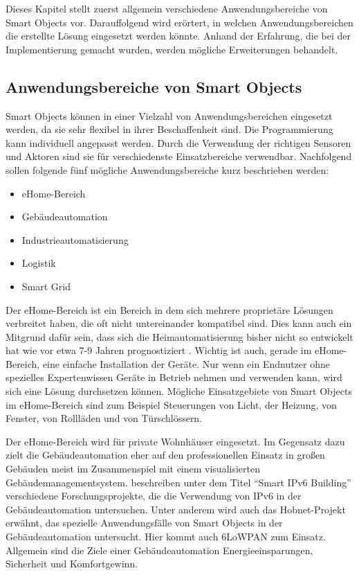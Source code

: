 Dieses Kapitel stellt zuerst allgemein verschiedene Anwendungsbereiche von Smart Objects vor. Darauffolgend wird erörtert, in welchen Anwendungsbereichen die erstellte Lösung eingesetzt werden könnte. Anhand der Erfahrung, die bei der Implementierung gemacht wurden, werden mögliche Erweiterungen behandelt.

\subsection{Anwendungsbereiche von Smart Objects}

Smart Objects können in einer Vielzahl von Anwendungsbereichen eingesetzt werden, da sie sehr flexibel in ihrer Beschaffenheit sind. Die Programmierung kann individuell angepasst werden. Durch die Verwendung der richtigen Sensoren und Aktoren sind sie für verschiedenste Einsatzbereiche verwendbar. Nachfolgend sollen folgende fünf mögliche Anwendungsbereiche kurz beschrieben werden:

\begin{itemize}
	\itemsep 0pt
	\item eHome-Bereich
	\item Gebäudeautomation
	\item Industrieautomatisierung
	\item Logistik
	\item Smart Grid
\end{itemize}

Der eHome-Bereich ist ein Bereich in dem sich mehrere proprietäre Lösungen verbreitet haben, die oft nicht untereinander kompatibel sind. Dies kann auch ein Mitgrund dafür sein, dass sich die Heimautomatisierung bisher nicht so entwickelt hat wie vor etwa 7-9 Jahren prognostiziert \citep[360]{vasseur10interconnecting}. Wichtig ist auch, gerade im eHome-Bereich, eine einfache Installation der Geräte. Nur wenn ein Endnutzer ohne spezielles Expertenwissen Geräte in Betrieb nehmen und verwenden kann, wird sich eine Lösung durchsetzen können. Mögliche Einsatzgebiete von Smart Objects im eHome-Bereich sind zum Beispiel Steuerungen von Licht, der Heizung, von Fenster, von Rollläden und von Türschlössern.

Der eHome-Bereich wird für private Wohnhäuser eingesetzt. Im Gegensatz dazu zielt die Gebäudeautomation eher auf den professionellen Einsatz in großen Gebäuden meist im Zusammenspiel mit einem visualisierten Gebäudemanagementsystem. \textcite[Seite 304ff]{Vermesan:TheInternetOfThings} beschreiben unter dem Titel "`Smart IPv6 Building"' verschiedene Forschungsprojekte, die die Verwendung von IPv6 in der Gebäudeautomation untersuchen. Unter anderem wird auch das Hobnet-Projekt erwähnt, das spezielle Anwendungsfälle von Smart Objects in der Gebäudeautomation untersucht. Hier kommt auch 6LoWPAN zum Einsatz. Allgemein sind die Ziele einer Gebäudeautomation Energieeinsparungen, Sicherheit und Komfortgewinn.


